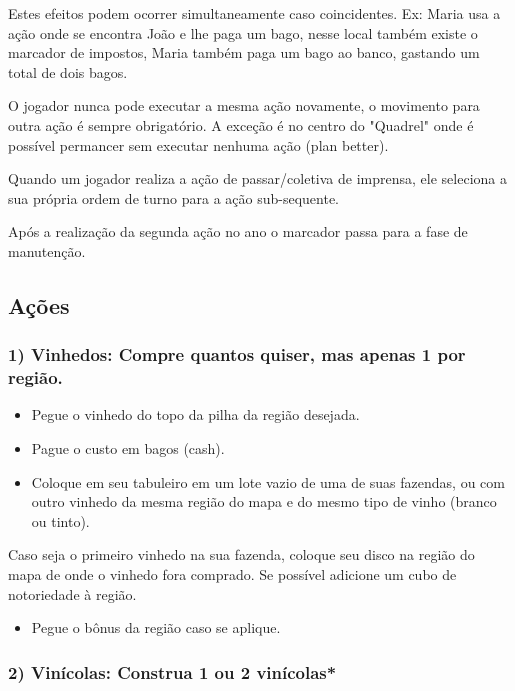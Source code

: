 \documentclass[11pt]{article}
\begin{document}
Estes efeitos podem ocorrer simultaneamente caso coincidentes.
Ex: Maria usa a ação onde se encontra João e lhe paga um bago, nesse local também existe o marcador de impostos, Maria também paga um bago ao banco, gastando um total de dois bagos.

O jogador nunca pode executar a mesma ação novamente, o movimento para outra ação é sempre obrigatório. A exceção é no centro do "Quadrel" onde é possível permancer sem executar nenhuma ação (plan better).

Quando um jogador realiza a ação de passar/coletiva de imprensa, ele seleciona a sua própria ordem de turno para a ação sub-sequente.

Após a realização da segunda ação no ano o marcador passa para a fase de manutenção.

\subsection{Ações}
\label{sec:orgc5e922a}

\subsubsection{1) Vinhedos: Compre quantos quiser, mas apenas 1 por região.}
\label{sec:org4b28f40}

\begin{itemize}
\item Pegue o vinhedo do topo da pilha da região desejada.
\item Pague o custo em bagos (cash).
\item Coloque em seu tabuleiro em um lote vazio de uma de suas fazendas, ou com outro vinhedo da mesma região do mapa e do mesmo tipo de vinho (branco ou tinto).
\end{itemize}

Caso seja o primeiro vinhedo na sua fazenda, coloque seu disco na região do mapa de onde o vinhedo fora comprado. Se possível adicione um cubo de notoriedade à região.

\begin{itemize}
\item Pegue o bônus da região caso se aplique.
\end{itemize}

\subsubsection{2) Vinícolas: Construa 1 ou 2 vinícolas*}
\label{sec:orgdddea4f}
\end{document}
